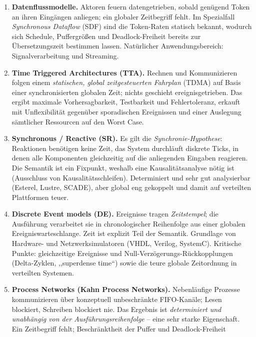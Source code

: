 \begin{loesung}
\begin{enumerate}[label=(\alph*)]
    \item \textbf{Datenflussmodelle.} Aktoren feuern datengetrieben, sobald genügend Token an ihren
          Eingängen anliegen; ein globaler Zeitbegriff fehlt. Im Spezialfall \emph{Synchronous
          Dataflow} (SDF) sind die Token-Raten statisch bekannt, wodurch sich Schedule, Puffergrößen
          und Deadlock-Freiheit bereits zur Übersetzungszeit bestimmen lassen. Natürlicher
          Anwendungsbereich: Signalverarbeitung und Streaming.
    \item \textbf{Time Triggered Architectures (TTA).} Rechnen und Kommunizieren folgen einem
          \emph{statischen, global zeitgesteuerten Fahrplan} (TDMA) auf Basis einer synchronisierten
          globalen Zeit; nichts geschieht ereignisgetrieben. Das ergibt maximale Vorhersagbarkeit,
          Testbarkeit und Fehlertoleranz, erkauft mit Unflexibilität gegenüber sporadischen
          Ereignissen und einer Auslegung sämtlicher Ressourcen auf den Worst Case.
    \item \textbf{Synchronous / Reactive (SR).} Es gilt die \emph{Synchronie-Hypothese}: Reaktionen
          benötigen keine Zeit, das System durchläuft diskrete Ticks, in denen alle Komponenten
          gleichzeitig auf die anliegenden Eingaben reagieren. Die Semantik ist ein Fixpunkt, weshalb
          eine Kausalitätsanalyse nötig ist (Ausschluss von Kausalitätsschleifen). Determiniert und
          sehr gut analysierbar (Esterel, Lustre, SCADE), aber global eng gekoppelt und damit auf
          verteilten Plattformen teuer.
    \item \textbf{Discrete Event models (DE).} Ereignisse tragen \emph{Zeitstempel}; die Ausführung
          verarbeitet sie in chronologischer Reihenfolge aus einer globalen Ereigniswarteschlange.
          Zeit ist explizit Teil der Semantik. Grundlage von Hardware- und Netzwerksimulatoren
          (VHDL, Verilog, SystemC). Kritische Punkte: gleichzeitige Ereignisse und
          Null-Verzögerungs-Rückkopplungen (Delta-Zyklen, ,,superdense time``) sowie die teure
          globale Zeitordnung in verteilten Systemen.
    \item \textbf{Process Networks (Kahn Process Networks).} Nebenläufige Prozesse kommunizieren über
          konzeptuell unbeschränkte FIFO-Kanäle; Lesen blockiert, Schreiben blockiert nie. Das
          Ergebnis ist \emph{determiniert und unabhängig von der Ausführungsreihenfolge} -- eine sehr
          starke Eigenschaft. Ein Zeitbegriff fehlt; Beschränktheit der Puffer und Deadlock-Freiheit

\end{enumerate}
\end{loesung}

